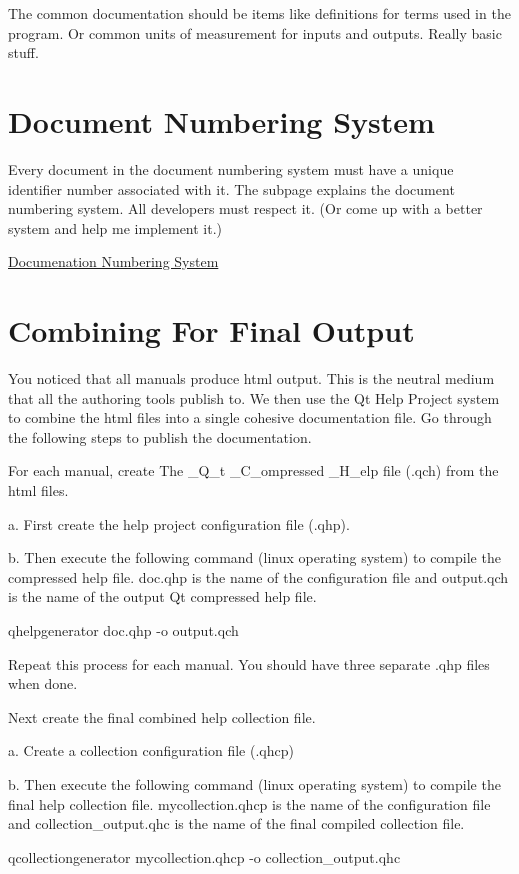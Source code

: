 The common documentation should be items like definitions for terms used in the program. Or common units of measurement for inputs and outputs. Really basic stuff.

\section*{Document Numbering System}

Every document in the document numbering system must have a unique identifier number associated with it. The subpage explains the document numbering system. All developers must respect it. (Or come up with a better system and help me implement it.)

\hyperlink{docnumbersys}{Documenation Numbering System}\hypertarget{documentation_documentation_combine}{}\section{Combining For Final Output}\label{documentation_documentation_combine}
You noticed that all manuals produce html output. This is the neutral medium that all the authoring tools publish to. We then use the Qt Help Project system to combine the html files into a single cohesive documentation file. Go through the following steps to publish the documentation.


\begin{DoxyEnumerate}
\item For each manual, create The \-\_\-\-Q\-\_\-t \-\_\-\-C\-\_\-ompressed \-\_\-\-H\-\_\-elp file (.qch) from the html files.

a. First create the help project configuration file (.qhp).

b. Then execute the following command (linux operating system) to compile the compressed help file. doc.\-qhp is the name of the configuration file and output.\-qch is the name of the output Qt compressed help file. \begin{DoxyVerb}qhelpgenerator doc.qhp -o output.qch
\end{DoxyVerb}

\item Repeat this process for each manual. You should have three separate .qhp files when done.
\item Next create the final combined help collection file.

a. Create a collection configuration file (.qhcp)

b. Then execute the following command (linux operating system) to compile the final help collection file. mycollection.\-qhcp is the name of the configuration file and collection\-\_\-output.\-qhc is the name of the final compiled collection file. \begin{DoxyVerb}qcollectiongenerator mycollection.qhcp -o collection_output.qhc
\end{DoxyVerb}

\end{DoxyEnumerate}

